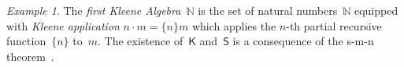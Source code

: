 \documentclass[12pt]{article}
\newcommand{\natpair}[1]{\langle{#1}\rangle}
\newcommand{\such}{\;{\big|}\;}
\newcommand{\cc}{\colon}
\newcommand{\tcc}{\,{:}\,}
\newcommand{\pcacomb}[1]{\mathsf{#1}}
\newcommand{\brset}[1]{\left\{#1\right\}}
\newcommand{\combK}{\pcacomb{K}}
\newcommand{\combS}{\pcacomb{S}}
\newcommand{\tand}{\ \text{\textnormal{and}}\ }
\newcommand{\finsetsym}{\mathsf{finset}}
\newcommand{\finset}[1]{\finsetsym\,#1}
\newcommand{\some}[3]{\exists\, #1 \,{\in}\, #2\,.\left(#3\right)}
\newcommand{\xulam}[2]{\lambda #1 .\,#2}
\newcommand{\xtlam}[3]{\lambda #1 \tcc #2\,.\,#3}
\newcommand{\N}{\ensuremath{\mathbb{N}}}
\renewcommand{\P}{\ensuremath{\mathbb{P}}}
\newcommand{\PP}{\ensuremath{\mathcal{P}}}
\renewcommand{\to}{\ensuremath{\rightarrow}}
\theoremstyle{remark}
\newtheorem{example}[theorem]{Example}
\theoremstyle{definition}
\begin{document}
%

\begin{example}
  The \emph{first Kleene Algebra~$\N$} is the set of natural
  numbers~$\N$ equipped with \emph{Kleene application} $n \cdot m =
  \{n\} m$ which applies the $n$-th partial recursive function~$\{n\}$
  to~$m$.  The existence of~$\combK$ and~$\combS$ is a consequence of
  the s-m-n theorem~\cite{Rogers:87}.
\end{example}
\end{document}
